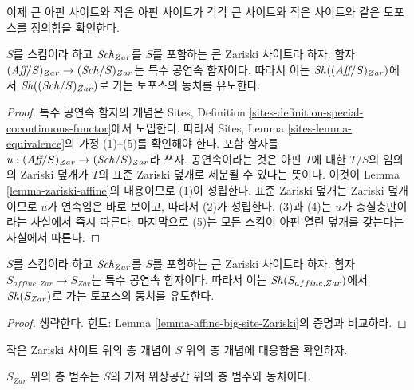 \noindent
이제 큰 아핀 사이트와 작은 아핀 사이트가 각각 큰 사이트와 작은
사이트와 같은 토포스를 정의함을 확인한다.

\begin{lemma}
\label{lemma-affine-big-site-Zariski}
$S$를 스킴이라 하고 $\mathit{Sch}_{Zar}$를 $S$를 포함하는 큰 Zariski
사이트라 하자. 함자 $(\textit{Aff}/S)_{Zar} \to (\mathit{Sch}/S)_{Zar}$는
특수 공연속 함자이다. 따라서 이는 $\mathop{\mathit{Sh}}\nolimits((\textit{Aff}/S)_{Zar})$에서
$\mathop{\mathit{Sh}}\nolimits((\mathit{Sch}/S)_{Zar})$로 가는 토포스의 동치를 유도한다.
\end{lemma}

\begin{proof}
특수 공연속 함자의 개념은 Sites, Definition
\ref{sites-definition-special-cocontinuous-functor}에서 도입한다.
따라서 Sites, Lemma \ref{sites-lemma-equivalence}의 가정 (1)--(5)를
확인해야 한다. 포함 함자를
$u : (\textit{Aff}/S)_{Zar} \to (\mathit{Sch}/S)_{Zar}$라 쓰자. 공연속이라는
것은 아핀 $T$에 대한 $T/S$의 임의의 Zariski 덮개가 $T$의 표준 Zariski
덮개로 세분될 수 있다는 뜻이다. 이것이 Lemma
\ref{lemma-zariski-affine}의 내용이므로 (1)이 성립한다. 표준 Zariski
덮개는 Zariski 덮개이므로 $u$가 연속임은 바로 보이고, 따라서 (2)가
성립한다. (3)과 (4)는 $u$가 충실충만이라는 사실에서 즉시 따른다.
마지막으로 (5)는 모든 스킴이 아핀 열린 덮개를 갖는다는 사실에서 따른다.
\end{proof}

\begin{lemma}
\label{lemma-alternative-zariski}
$S$를 스킴이라 하고 $\mathit{Sch}_{Zar}$를 $S$를 포함하는 큰 Zariski
사이트라 하자. 함자 $S_{affine, Zar} \to S_{Zar}$는 특수 공연속
함자이다. 따라서 이는 $\mathop{\mathit{Sh}}\nolimits(S_{affine, Zar})$에서 $\mathop{\mathit{Sh}}\nolimits(S_{Zar})$로
가는 토포스의 동치를 유도한다.
\end{lemma}

\begin{proof}
생략한다. 힌트: Lemma \ref{lemma-affine-big-site-Zariski}의 증명과
비교하라.
\end{proof}

\noindent
작은 Zariski 사이트 위의 층 개념이 $S$ 위의 층 개념에 대응함을
확인하자.

\begin{lemma}
\label{lemma-Zariski-usual}
$S_{Zar}$ 위의 층 범주는 $S$의 기저 위상공간 위의 층 범주와 동치이다.
\end{lemma}

